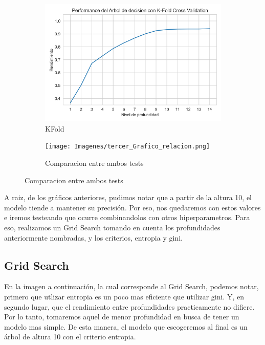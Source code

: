\documentclass[10pt,a4paper]{article}
\begin{document}
\begin{figure}[ht!]
	\begin{subfigure}{0.5\textwidth}
		\includegraphics[width=1\linewidth]{Imagenes/KFold_prueba_arbol.png} 
		\caption{KFold}
		\label{fig:subfig1}
	\end{subfigure}
	\begin{subfigure}{0.5\textwidth}
		\texttt{[image: Imagenes/tercer\_Grafico\_relacion.png]}
		\caption{Comparacion entre ambos tests}
		\label{fig:subfig2}
	\end{subfigure}
	\label{fig:subfigs}
\end{figure}

A raiz, de los gráficos anteriores, pudimos notar que a partir de la altura 10, el modelo tiende a mantener su precisión. Por eso, nos quedaremos con estos valores e iremos testeando que ocurre combinandolos con otros hiperparametros. Para eso, realizamos un Grid Search tomando en cuenta los profundidades anteriormente nombradas, y los criterios, entropia y gini.

\newpage

\subsection{Grid Search}

En la imagen a continuación, la cual corresponde al Grid Search, podemos notar, primero que utlizar entropia es un poco mas eficiente que utilizar gini. Y, en segundo lugar, que el rendimiento entre profundidades practicamente no difiere. Por lo tanto, tomaremos aquel de menor profundidad en busca de tener un modelo mas simple. De esta manera, el modelo que escogeremos al final es un árbol de altura 10 con el criterio entropia. \vspace{0.05cm}
\end{document}
